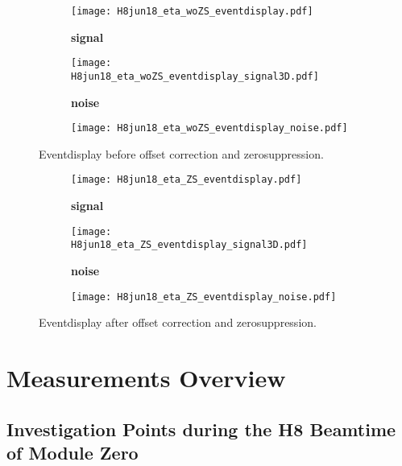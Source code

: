 \documentclass[
twoside,            %
BCOR1.4cm,          %
10pt,               %
headings=normal,    %
headsepline,        %
clearplainpage,		%
final,              %
div=14,
open=right,
bibliography=toc
]{scrreprt}
\begin{document}
\begin{figure}[!h]
	\begin{subfigure}[b]{0.48\textwidth}
		\centering
		\texttt{[image: H8jun18\_eta\_woZS\_eventdisplay.pdf]}
		\label{eventdisplay_woZS} 
	\end{subfigure}
	\hfill
	\begin{subfigure}[b]{0.48\textwidth}
		\centering
		\textbf{signal}
		
		\hspace{10mm}\texttt{[image: H8jun18\_eta\_woZS\_eventdisplay\_signal3D.pdf]}
		
		\textbf{noise} 
		
		\hspace{10mm}\texttt{[image: H8jun18\_eta\_woZS\_eventdisplay\_noise.pdf]}
	\end{subfigure}
	\vspace{-2mm}
	\caption{
		Eventdisplay before offset correction and zerosuppression.
	}
	\label{displayBefore}
\end{figure}

\begin{figure}[!h]
	\begin{subfigure}[b]{0.48\textwidth}
		\centering
		\texttt{[image: H8jun18\_eta\_ZS\_eventdisplay.pdf]}
				\label{eventdisplay_woOffset_ZS} 
	\end{subfigure}
	\hfill
	\begin{subfigure}[b]{0.48\textwidth}
		\centering
		\textbf{signal}
		
		\hspace{10mm}\texttt{[image: H8jun18\_eta\_ZS\_eventdisplay\_signal3D.pdf]}
		
		\textbf{noise} 
		
		\hspace{10mm}\texttt{[image: H8jun18\_eta\_ZS\_eventdisplay\_noise.pdf]}
	\end{subfigure}
	\vspace{-2mm}
	\caption{
		Eventdisplay after offset correction and zerosuppression.
	}
	\label{displayAfter}
\end{figure}

\chapter{Measurements Overview}

\section{Investigation Points during the H8 Beamtime of Module Zero}
\end{document}
